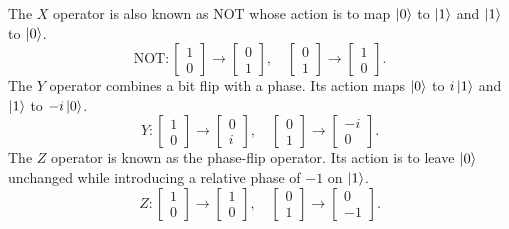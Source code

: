 \documentclass[../../../main.tex]{subfiles}
\begin{document}
The $X$ operator is also known as $\mathrm{NOT}$ whose action is to map $\ket{0}$ to $\ket{1}$ and  $\ket{1}$ to $\ket{0}$.
\begin{equation*}
  \mathrm{NOT} :  \begin{bmatrix} 1 \\ 0 \end{bmatrix} \rightarrow \begin{bmatrix} 0 \\ 1 \end{bmatrix}, \quad \begin{bmatrix} 0 \\ 1 \end{bmatrix} \rightarrow \begin{bmatrix} 1 \\ 0 \end{bmatrix}.
\end{equation*}
The \(Y\) operator combines a bit flip with a phase.
Its action maps \(\ket{0}\) to \(i\ket{1}\) and \(\ket{1}\) to \(-i\ket{0}\).
\begin{equation*}
  Y : \begin{bmatrix} 1 \\ 0 \end{bmatrix} \rightarrow \begin{bmatrix} 0 \\ i \end{bmatrix},
  \quad
  \begin{bmatrix} 0 \\ 1 \end{bmatrix} \rightarrow \begin{bmatrix} -i \\ 0 \end{bmatrix}.
\end{equation*}
The \(Z\) operator is known as the phase-flip operator. Its action is to leave \(\ket{0}\) unchanged while introducing a relative phase of \(-1\) on \(\ket{1}\).
\begin{equation*}
  Z : \begin{bmatrix} 1 \\ 0 \end{bmatrix} \rightarrow \begin{bmatrix} 1 \\ 0 \end{bmatrix},
  \quad
  \begin{bmatrix} 0 \\ 1 \end{bmatrix} \rightarrow \begin{bmatrix} 0 \\ -1 \end{bmatrix}.
\end{equation*}
\end{document}
